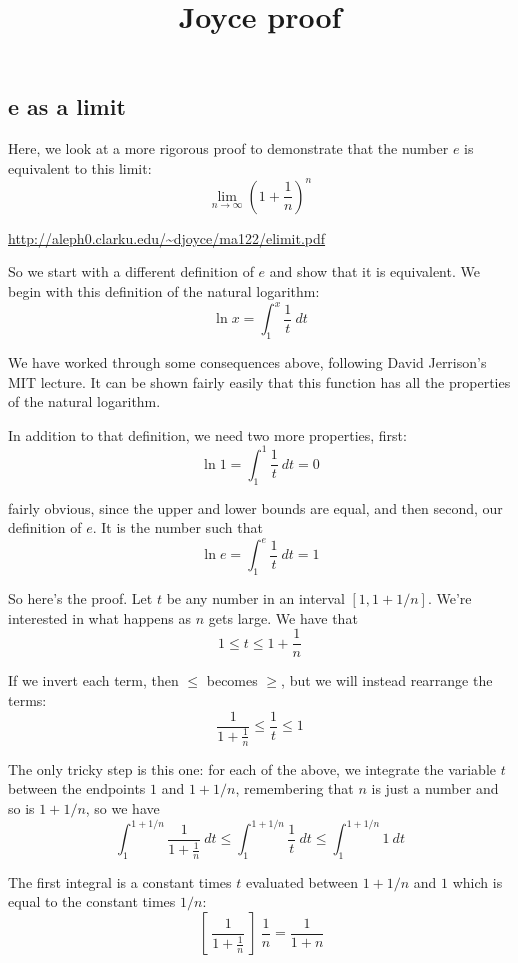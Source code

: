 \documentclass[11pt, oneside]{article}
\title{Joyce proof}
\date{}
\begin{document}
\maketitle
\Large


\subsection*{e as a limit}

Here, we look at a more rigorous proof to demonstrate that the number $e$ is equivalent to this limit:
\[ \lim_{n \rightarrow \infty} (1 + \frac{1}{n})^n \]

\url{http://aleph0.clarku.edu/~djoyce/ma122/elimit.pdf }

So we start with a different definition of $e$ and show that it is equivalent.  We begin with this definition of the natural logarithm:
\[ \ln x = \int_1^x \frac{1}{t} \ dt \]

We have worked through some consequences above, following David Jerrison's MIT lecture.  It can be shown fairly easily that this function has all the properties of the natural logarithm.

In addition to that definition, we need two more properties, first:
\[ \ln 1 = \int_1^1 \frac{1}{t} \ dt = 0 \]

fairly obvious, since the upper and lower bounds are equal, and then second, our definition of $e$.  It is the number such that
\[ \ln e = \int_1^e \frac{1}{t} \ dt = 1 \]

So here's the proof.  Let $t$ be any number in an interval $[1, 1 + 1/n]$.  We're interested in what happens as $n$ gets large.  We have that
\[ 1 \le t \le 1 + \frac{1}{n} \]

If we invert each term, then $\le$ becomes $\ge$, but we will instead rearrange the terms:
\[ \frac{1}{1 + \frac{1}{n}} \le \frac{1}{t} \le 1 \]

The only tricky step is this one:  for each of the above, we integrate the variable $t$ between the endpoints $1$ and $1 + 1/n$, remembering that $n$ is just a number and so is $1 + 1/n$, so we have
\[ \int_1^{1 + 1/n} \frac{1}{1 + \frac{1}{n}} \ dt \le \int_1^{1 + 1/n} \frac{1}{t} \ dt \le \int_1^{1 + 1/n}  1 \ dt \]

The first integral is a constant times $t$ evaluated between $1 + 1/n$ and $1$ which is equal to the constant times $1/n$:
\[ \ [ \ \frac{1}{1 + \frac{1}{n}} \ ] \  \frac{1}{n} = \frac{1}{1 + n} \]
\end{document}
